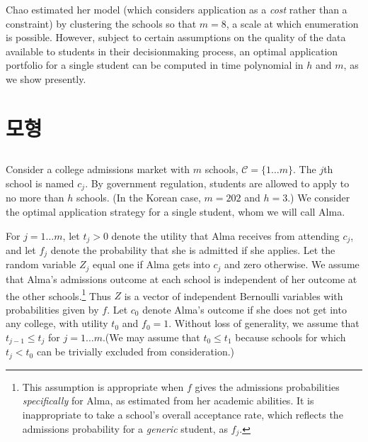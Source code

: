 \documentclass[12pt]{article} %
\newif\ifEN
\theoremstyle{definition}
\theoremstyle{definition}
\begin{document}
Chao estimated her model (which considers application as a \emph{cost} rather than a constraint) by clustering the schools so that $m=8$, a scale at which enumeration is possible. However, subject to certain assumptions on the quality of the data available to students in their decisionmaking process, an optimal application portfolio for a single student can be computed in time polynomial in $h$ and $m$, as we show presently.




\ifEN \section{Model}  \else \section{모형} \fi \label{optimalcollegeappstrat}

\ifEN \section{Homogeneous application costs}  \else \subsection{} \fi
Consider a college admissions market with $m$ schools, $\mathcal{C} = \{ 1 \dots m\}$. The $j$th school is named $c_j$. By government regulation, students are allowed to apply to no more than $h$ schools. (In the Korean case, $m=202$ and $h=3$.) We consider the optimal application strategy for a single student, whom we will call Alma.

For $j=1\dots m$, let $t_j > 0$ denote the utility that Alma receives from attending $c_j$, and let $f_j$ denote the probability that she is admitted if she applies. Let the random variable $Z_j$ equal one if Alma gets into $c_j$ and zero otherwise.  We assume that Alma’s admissions outcome at each school is independent of her outcome at the other schools.\footnote{This assumption is appropriate when $f$ gives the admissions probabilities \emph{specifically} for Alma, as estimated from her academic abilities. It is inappropriate to take a school's overall acceptance rate, which reflects the admissions probability for a \emph{generic} student, as $f_j$.} Thus $Z$ is a vector of independent Bernoulli variables with probabilities given by $f$. Let $c_0$ denote Alma's outcome if she does not get into any college, with utility $t_0$ and $f_0 = 1$. Without loss of generality, we assume that $t_{j-1} \leq t_j$ for $j=1 \dots m$.(We may assume that $t_0 \leq t_1$ because schools for which $t_j < t_0$ can be trivially excluded from consideration.)
\end{document}
